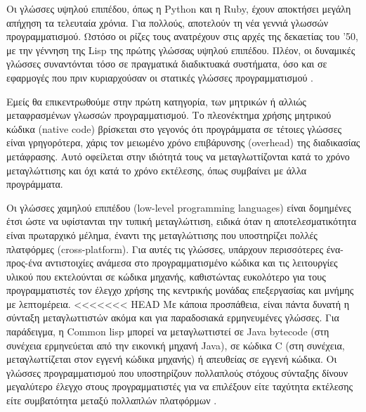 Οι γλώσσες υψηλού επιπέδου, όπως η Python και η Ruby, έχουν αποκτήσει μεγάλη απήχηση τα τελευταία χρόνια. Για πολλούς, αποτελούν τη νέα γεννιά γλωσσών προγραμματισμού. Ωστόσο οι ρίζες τους ανατρέχουν στις αρχές της δεκαετίας του '50, με την γέννηση της Lisp της πρώτης γλώσσας υψηλού επιπέδου. Πλέον, οι δυναμικές γλώσσες συναντόνται τόσο σε πραγματικά διαδικτυακά συστήματα, όσο και σε εφαρμογές που πριν κυριαρχούσαν οι στατικές γλώσσες προγραμματισμού \cite{[ADV09]}.

Εμείς θα επικεντρωθούμε στην πρώτη κατηγορία, των μητρικών ή αλλιώς μεταφρασμένων γλωσσών προγραμματισμού. Το πλεονέκτημα χρήσης μητρικού κώδικα (native code) βρίσκεται στο γεγονός ότι προγράμματα σε τέτοιες γλώσσες είναι γρηγορότερα, χάρις τον μειωμένο χρόνο επιβάρυνσης (overhead) της διαδικασίας μετάφρασης. Αυτό οφείλεται στην ιδιότητά τους να μεταγλωττίζονται κατά το χρόνο μεταγλώττισης και όχι κατά το χρόνο εκτέλεσης, όπως συμβαίνει με άλλα προγράμματα.

Οι γλώσσες χαμηλού επιπέδου (low-level programming languages) είναι δομημένες έτσι ώστε να υφίστανται την τυπική μεταγλώττιση, ειδικά όταν η αποτελεσματικότητα είναι πρωταρχικό μέλημα, έναντι της μεταγλώττισης που υποστηρίζει πολλές πλατφόρμες (cross-platform). Για αυτές τις γλώσσες, υπάρχουν περισσότερες ένα-προς-ένα αντιστοιχίες ανάμεσα στο προγραμματισμένο κώδικα και τις λειτουργίες υλικού που εκτελούνται σε κώδικα μηχανής, καθιστώντας ευκολότερο για τους προγραμματιστές τον έλεγχο χρήσης της κεντρικής μονάδας επεξεργασίας και μνήμης με λεπτομέρεια. 
<<<<<<< HEAD
Με κάποια προσπάθεια, είναι πάντα δυνατή η σύνταξη μεταγλωττιστών ακόμα και για παραδοσιακά ερμηνευμένες γλώσσες. Για παράδειγμα, η Common lisp μπορεί να μεταγλωττιστεί σε Java bytecode (στη συνέχεια ερμηνεύεται από την εικονική μηχανή Java), σε κώδικα C (στη συνέχεια, μεταγλωττίζεται στον εγγενή κώδικα μηχανής) ή απευθείας σε εγγενή κώδικα. Οι γλώσσες προγραμματισμού που υποστηρίζουν πολλαπλούς στόχους σύνταξης δίνουν μεγαλύτερο έλεγχο στους προγραμματιστές για να επιλέξουν είτε ταχύτητα εκτέλεσης είτε συμβατότητα μεταξύ πολλαπλών πλατφόρμων \cite{[SQA+07]}.

